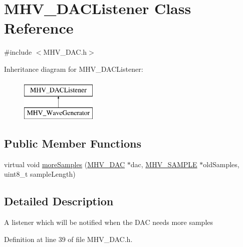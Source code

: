 \hypertarget{class_m_h_v___d_a_c_listener}{
\section{\-M\-H\-V\-\_\-\-D\-A\-C\-Listener \-Class \-Reference}
\label{class_m_h_v___d_a_c_listener}
}


{\ttfamily \#include $<$\-M\-H\-V\-\_\-\-D\-A\-C.\-h$>$}

\-Inheritance diagram for \-M\-H\-V\-\_\-\-D\-A\-C\-Listener\-:\begin{figure}[H]
\begin{center}
\leavevmode
\includegraphics[height=2.000000cm]{class_m_h_v___d_a_c_listener}
\end{center}
\end{figure}
\subsection*{\-Public \-Member \-Functions}
\begin{DoxyCompactItemize}
\item 
virtual void \hyperlink{class_m_h_v___d_a_c_listener_a13bdc72b48cbe990100bf9da86a6ac43}{more\-Samples} (\hyperlink{class_m_h_v___d_a_c}{\-M\-H\-V\-\_\-\-D\-A\-C} $\ast$dac, \hyperlink{_m_h_v___d_a_c_8h_a5ed12db0bcd6a3870733daecfb30e640}{\-M\-H\-V\-\_\-\-S\-A\-M\-P\-L\-E} $\ast$old\-Samples, uint8\-\_\-t sample\-Length)
\end{DoxyCompactItemize}


\subsection{\-Detailed \-Description}
\-A listener which will be notified when the \-D\-A\-C needs more samples 

\-Definition at line 39 of file \-M\-H\-V\-\_\-\-D\-A\-C.\-h.




